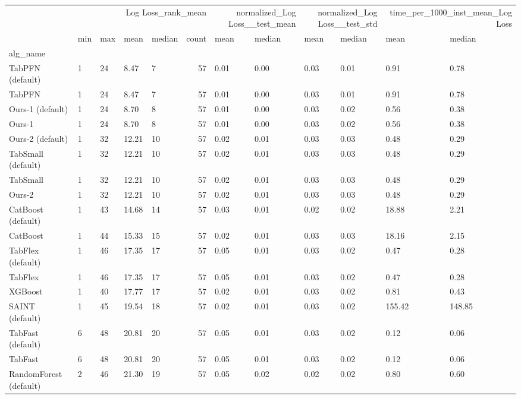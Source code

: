 \begin{tabular}{lllllrllllll}
\toprule
 & \multicolumn{5}{r}{Log Loss_rank_mean} & \multicolumn{2}{r}{normalized_Log Loss__test_mean} & \multicolumn{2}{r}{normalized_Log Loss__test_std} & \multicolumn{2}{r}{time_per_1000_inst_mean_Log Loss} \\
 & min & max & mean & median & count & mean & median & mean & median & mean & median \\
alg_name &  &  &  &  &  &  &  &  &  &  &  \\
\midrule
TabPFN (default) & 1 & 24 & 8.47 & 7 & 57 & 0.01 & 0.00 & 0.03 & 0.01 & 0.91 & 0.78 \\
TabPFN & 1 & 24 & 8.47 & 7 & 57 & 0.01 & 0.00 & 0.03 & 0.01 & 0.91 & 0.78 \\
Ours-1 (default) & 1 & 24 & 8.70 & 8 & 57 & 0.01 & 0.00 & 0.03 & 0.02 & 0.56 & 0.38 \\
Ours-1 & 1 & 24 & 8.70 & 8 & 57 & 0.01 & 0.00 & 0.03 & 0.02 & 0.56 & 0.38 \\
Ours-2 (default) & 1 & 32 & 12.21 & 10 & 57 & 0.02 & 0.01 & 0.03 & 0.03 & 0.48 & 0.29 \\
TabSmall (default) & 1 & 32 & 12.21 & 10 & 57 & 0.02 & 0.01 & 0.03 & 0.03 & 0.48 & 0.29 \\
TabSmall & 1 & 32 & 12.21 & 10 & 57 & 0.02 & 0.01 & 0.03 & 0.03 & 0.48 & 0.29 \\
Ours-2 & 1 & 32 & 12.21 & 10 & 57 & 0.02 & 0.01 & 0.03 & 0.03 & 0.48 & 0.29 \\
CatBoost (default) & 1 & 43 & 14.68 & 14 & 57 & 0.03 & 0.01 & 0.02 & 0.02 & 18.88 & 2.21 \\
CatBoost & 1 & 44 & 15.33 & 15 & 57 & 0.02 & 0.01 & 0.03 & 0.03 & 18.16 & 2.15 \\
TabFlex (default) & 1 & 46 & 17.35 & 17 & 57 & 0.05 & 0.01 & 0.03 & 0.02 & 0.47 & 0.28 \\
TabFlex & 1 & 46 & 17.35 & 17 & 57 & 0.05 & 0.01 & 0.03 & 0.02 & 0.47 & 0.28 \\
XGBoost & 1 & 40 & 17.77 & 17 & 57 & 0.02 & 0.01 & 0.03 & 0.02 & 0.81 & 0.43 \\
SAINT (default) & 1 & 45 & 19.54 & 18 & 57 & 0.02 & 0.01 & 0.03 & 0.02 & 155.42 & 148.85 \\
TabFast (default) & 6 & 48 & 20.81 & 20 & 57 & 0.05 & 0.01 & 0.03 & 0.02 & 0.12 & 0.06 \\
TabFast & 6 & 48 & 20.81 & 20 & 57 & 0.05 & 0.01 & 0.03 & 0.02 & 0.12 & 0.06 \\
RandomForest (default) & 2 & 46 & 21.30 & 19 & 57 & 0.05 & 0.02 & 0.02 & 0.02 & 0.80 & 0.60 \\

\end{tabular}
